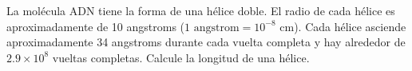 \item La molécula ADN tiene la forma de una hélice doble. El radio de cada hélice es aproximadamente de 10 angstroms ($1 \text{ angstrom} = 10^{-8} \text{ cm}$). Cada hélice asciende aproximadamente 34 angstroms durante cada vuelta completa y hay alrededor de $2.9 \times 10^8$ vueltas completas. Calcule la longitud de una hélice.
